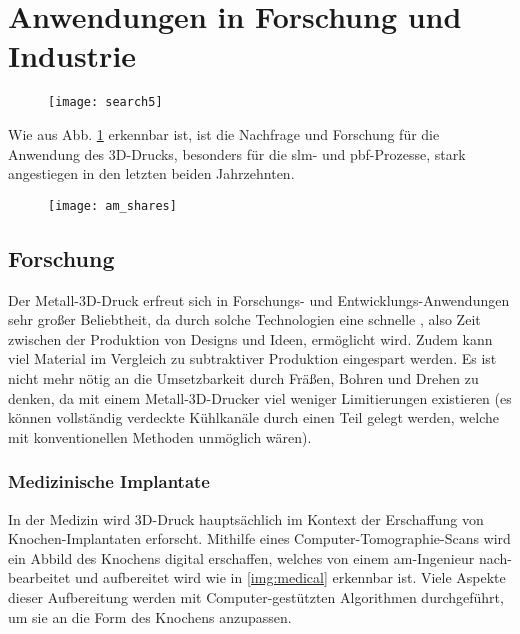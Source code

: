 \documentclass[../main.tex]{subfiles}
\begin{document}
\section{Anwendungen in Forschung und Industrie}
\begin{figure}[H]
	\centering
	\texttt{[image: search5]}
	\label{img:search_5}
\end{figure}
Wie aus Abb. \ref{img:search_5} erkennbar ist, ist die Nachfrage und Forschung für die Anwendung des 3D-Drucks, besonders für die \acrlong{slm}- und \acrfull{pbf}-Prozesse, stark angestiegen in den letzten beiden Jahrzehnten.

\begin{figure}[H]
	\centering
	\texttt{[image: am\_shares]}
	\label{img:am_shares}
\end{figure} 
\subsection{Forschung}
Der Metall-3D-Druck erfreut sich in Forschungs- und Entwicklungs-Anwendungen sehr großer Beliebtheit, da durch solche Technologien eine schnelle , also Zeit zwischen der Produktion von Designs und Ideen, ermöglicht wird. Zudem kann viel Material im Vergleich zu subtraktiver Produktion eingespart werden. Es ist nicht mehr nötig an die Umsetzbarkeit durch Fräßen, Bohren und Drehen zu denken, da mit einem Metall-3D-Drucker viel weniger Limitierungen existieren (es können vollständig verdeckte Kühlkanäle durch einen Teil gelegt werden, welche mit konventionellen Methoden unmöglich wären).
\subsubsection*{Medizinische Implantate}
In der Medizin wird 3D-Druck hauptsächlich im Kontext der Erschaffung von Knochen-Implantaten erforscht. Mithilfe eines Computer-Tomographie-Scans wird ein Abbild des Knochens digital erschaffen, welches von einem \acrshort{am}-Ingenieur nach-bearbeitet und aufbereitet wird wie in \ref{img:medical} erkennbar ist. Viele Aspekte dieser Aufbereitung werden mit Computer-gestützten Algorithmen durchgeführt, um sie an die Form des Knochens anzupassen.\parencite{doi:10.1146/annurev-bioeng-082020-032402}
\end{document}

